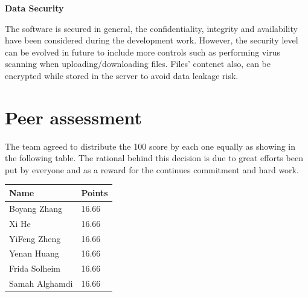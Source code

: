 \documentclass{article}
\begin{document}
\textbf{Data Security}

The software is secured in general, the confidentiality, integrity and availability have been considered during the development work. However, the security level can be evolved in future to include more controls such as performing virus scanning when uploading/downloading files. Files’ contenet also, can be encrypted while stored in the server to avoid data leakage risk.

\section{Peer assessment}
The team agreed to distribute the 100 score by each one equally as showing in the following table. The rational behind this decision is due to great efforts been put by everyone and as a reward for the continues commitment and hard work.


\begin{center}
\begin{tabular}{ | m{3cm}| m{1.3cm} | }
\hline
\textbf{Name} & \textbf{Points}  \\
\hline
Boyang Zhang & 16.66  \\
\hline
Xi He & 16.66  \\
\hline
YiFeng Zheng & 16.66 \\
\hline
Yenan Huang & 16.66 \\
\hline
Frida Solheim & 16.66 \\
\hline
Samah Alghamdi & 16.66 \\
\hline
\end{tabular}
\end{center}
\end{document}
